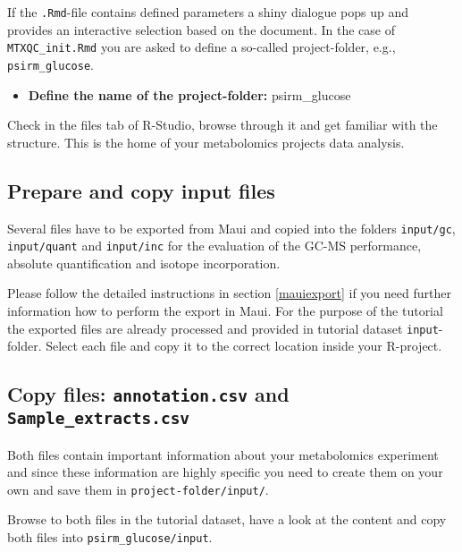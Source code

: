 \documentclass[]{book}
\providecommand{\tightlist}{%
  \setlength{\itemsep}{0pt}\setlength{\parskip}{0pt}}
\begin{document}
If the \texttt{.Rmd}-file contains defined parameters a shiny dialogue pops up and provides an interactive selection based on the document. In the case of \texttt{MTXQC\_init.Rmd} you are asked to define a so-called project-folder, e.g., \texttt{psirm\_glucose}.

\begin{itemize}
\tightlist
\item
  \textbf{Define the name of the project-folder:} psirm\_glucose
\end{itemize}

Check in the files tab of R-Studio, browse through it and get familiar with the structure. This is the home of your metabolomics projects data analysis.

\hypertarget{prepare-and-copy-input-files}{%
\subsection{Prepare and copy input files}\label{prepare-and-copy-input-files}}

Several files have to be exported from Maui and copied into the folders \texttt{input/gc}, \texttt{input/quant} and \texttt{input/inc} for the evaluation of the GC-MS performance, absolute quantification and isotope incorporation.

Please follow the detailed instructions in section \ref{mauiexport} if you need further information how to perform the export in Maui. For the purpose of the tutorial the exported files are already processed and provided in tutorial dataset \texttt{input}-folder.
Select each file and copy it to the correct location inside your R-project.

\hypertarget{copy-files-annotation.csv-and-sample_extracts.csv}{%
\subsection{\texorpdfstring{Copy files: \texttt{annotation.csv} and \texttt{Sample\_extracts.csv}}{Copy files: annotation.csv and Sample\_extracts.csv}}\label{copy-files-annotation.csv-and-sample_extracts.csv}}

Both files contain important information about your metabolomics experiment and since these information are highly specific you need to create them on your own and save them in \texttt{project-folder/input/}.

Browse to both files in the tutorial dataset, have a look at the content and copy both files into \texttt{psirm\_glucose/input}.
\end{document}
